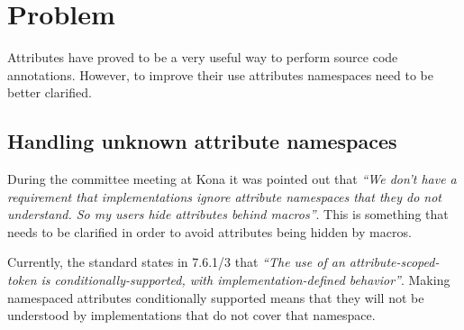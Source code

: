 \section{Problem}

Attributes have proved to be a very useful way to perform
source code annotations. However, to improve their use 
attributes namespaces need to be better clarified.

\subsection{Handling unknown attribute namespaces}

During the committee meeting at Kona it was pointed out that \emph{``We don't
have a requirement that implementations ignore attribute namespaces that they
do not understand. So my users hide attributes behind macros''}. This is something
that needs to be clarified in order to avoid attributes being hidden by macros.

Currently, the standard states in 7.6.1/3 that \emph{``The use of an
attribute-scoped-token is conditionally-supported, with implementation-defined
behavior''}. Making namespaced attributes conditionally supported means that
they will not be understood by implementations that do not cover that namespace.
